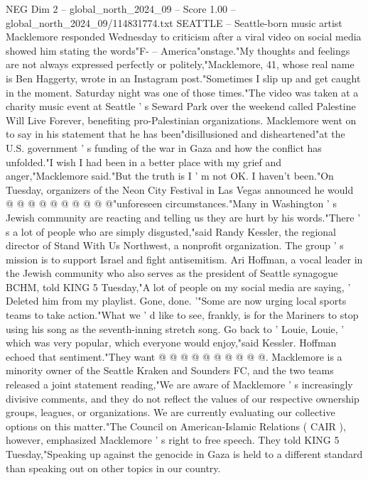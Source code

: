 \begin{textsample}{NEG Dim 2 – global\_north\_2024\_09 – Score 1.00 – global\_north\_2024\_09/114831774.txt}  \label{ex:f2_neg_319}
SEATTLE -- Seattle-born music artist Macklemore responded Wednesday to criticism after a viral video on social media showed him stating the words"F- -- America"onstage."My thoughts and feelings are not always expressed perfectly or politely,"Macklemore, 41, whose real name is Ben Haggerty, wrote in an Instagram post."Sometimes I slip up and get caught in the moment.
Saturday night was one of those times."The video was taken at a charity music event at Seattle ' s Seward Park over the weekend called Palestine Will Live Forever, benefiting pro-Palestinian organizations.
Macklemore went on to say in his statement that he has been"disillusioned and disheartened"at the U.S. government ' s funding of the war in Gaza and how the conflict has unfolded."I wish I had been in a better place with my grief and anger,"Macklemore said."But the truth is I ' m not OK.
I haven't been."On Tuesday, organizers of the Neon City Festival in Las Vegas announced he would @ @ @ @ @ @ @ @ @ @"unforeseen circumstances."Many in Washington ' s Jewish community are reacting and telling us they are hurt by his words."There ' s a lot of people who are simply disgusted,"said Randy Kessler, the regional director of Stand With Us Northwest, a nonprofit organization.
The group ' s mission is to support Israel and fight antisemitism.
Ari Hoffman, a vocal leader in the Jewish community who also serves as the president of Seattle synagogue BCHM, told KING 5 Tuesday,"A lot of people on my social media are saying, ' Deleted him from my playlist.
Gone, done. '"Some are now urging local sports teams to take action."What we ' d like to see, frankly, is for the Mariners to stop using his song as the seventh-inning stretch song.
Go back to ' Louie, Louie, ' which was very popular, which everyone would enjoy,"said Kessler.
Hoffman echoed that sentiment."They want @ @ @ @ @ @ @ @ @ @.
Macklemore is a minority owner of the Seattle Kraken and Sounders FC, and the two teams released a joint statement reading,"We are aware of Macklemore ' s increasingly divisive comments, and they do not reflect the values of our respective ownership groups, leagues, or organizations.
We are currently evaluating our collective options on this matter."The Council on American-Islamic Relations ( CAIR ), however, emphasized Macklemore ' s right to free speech.
They told KING 5 Tuesday,"Speaking up against the genocide in Gaza is held to a different standard than speaking out on other topics in our country.

\end{textsample}
